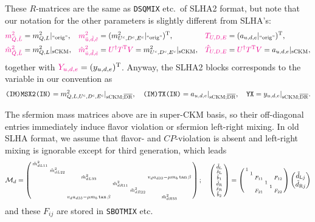 \documentclass[CheatSheet]{subfiles}
\begin{document}
These $R$-matrices are the same as \texttt{DSQMIX} etc.\ of SLHA2 format, but
note that our notation for the other parameters is slightly different from SLHA's:
\begin{align}
 {\color{magenta}m^2_{\tilde Q,\tilde L}} &=  m^2_{Q,L}|_\text{``orig''},&
 {\color{magenta}m^2_{\tilde u,\tilde d,\tilde e}} &=  (m^2_{U^c,D^c,E^c}|_\text{``orig''})^{\mathrm{T}},&
 {\color{magenta}T_{U,D,E}} &= (a_{u,d,e}|_\text{``orig''})^{\mathrm{T}},
\\
 {\color{magenta}\hat m^2_{\tilde Q,\tilde L}} &=  m^2_{Q,L}|_\text{sCKM},&
 {\color{magenta}\hat m^2_{\tilde u,\tilde d,\tilde e}} &=
 {\color{magenta}U^\dagger T^{\mathrm{T}} V} = m^2_{U^c,D^c,E^c}|_\text{sCKM},&
 {\color{magenta}\hat T_{U,D,E}} &= {\color{magenta}U^\dagger T^{\mathrm{T}} V} = a_{u,d,e}|_{\mathrm{sCKM}},
\end{align}
together with ${\color{magenta}Y_{u,d,e}} = (y_{u,d,e})^{\mathrm{T}}$.
Anyway, the SLHA2 blocks corresponds to the variable in our convention as
\begin{equation}
 \texttt{(IM)MSX2(IN)} = m^2_{Q, L, U^{\mathrm{c}}, D^{\mathrm{c}}, E^{\mathrm{c}}}|_{\mathrm{sCKM;\overline{DR}}},
\quad
 \texttt{(IM)TX(IN)} =  a_{u,d,e}|_{\mathrm{sCKM;\overline{DR}}},
\quad
 \texttt{YX} =  y_{u,d,e}|_{\mathrm{sCKM;\overline{DR}}}.
\end{equation}

The sfermion mass matrices above are in super-CKM basis, so their off-diagonal entries immediately induce flavor violation or sfermion left-right mixing.
In old SLHA format, we assume that flavor- and $CP$-violation is absent and left-right mixing is ignorable except for third generation, which leads
\begin{equation}
 \mathcal M_d= \left(\begin{smallmatrix}
  \tilde m^2_{dL11} & & & & &\\
  & \tilde m^2_{dL22} & & & &\\
  & & \tilde m^2_{dL33} & & & v_d a_{d33}-\mu m_b\tan\beta\\
  & & & \tilde m^2_{dR11} & &\\
  & & & & \tilde m^2_{dR22} &\\
  & & v_da_{d33}-\mu m_b\tan\beta&& & \tilde m^2_{dR33}
\end{smallmatrix}\right);\quad
\left(\begin{smallmatrix}
\tilde d_{\mathrm{L}}\\\tilde s_{\mathrm{L}} \\\tilde b_1\\\tilde d_{\mathrm{R}}\\\tilde s_{\mathrm{R}} \\\tilde b_2
\end{smallmatrix}\right)
=
\left(\begin{smallmatrix}
1&&&&&\\&1&&&&\\
&&F_{11}&&&F_{12}\\
&&&1&&\\&&&&1&\\
&&F_{21}&&&F_{22}\\
\end{smallmatrix}\right)
\begin{pmatrix}\tilde d_{\mathrm Lj}\\\tilde d_{\mathrm Rj}\end{pmatrix}
\end{equation}
and these $F_{ij}$ are stored in \texttt{SBOTMIX} etc.
\end{document}
